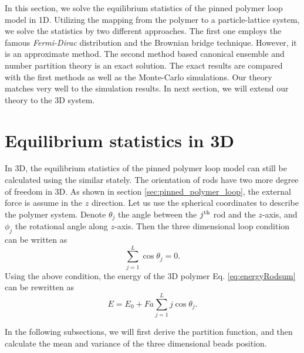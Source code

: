 In this section, we solve the equilibrium statistics of the pinned polymer loop model in 1D. Utilizing the mapping from the polymer to a particle-lattice system, we solve the statistics by two different approaches. The first one employs the famous \emph{Fermi-Dirac} distribution and the Brownian bridge technique. However, it is an approximate method. The second method based canonical ensemble and number partition theory is an exact solution. The exact results are compared with the first methods as well as the Monte-Carlo simulations. Our theory matches very well to the simulation results. In next section, we will extend our theory to the 3D system. 




\section{Equilibrium statistics in 3D}
\label{sec:equilibrium_statistics_in_3d}
In 3D, the equilibrium statistics of the pinned polymer loop model can still be calculated using the similar stately. The orientation of rods have two more degree of freedom in 3D. As shown in section \ref{sec:pinned_polymer_loop}, the external force is assume in the $z$ direction. Let us use the spherical coordinates to describe the polymer system. Denote $\theta_j$ the angle between the $j^{\rm{th}}$ rod and the $z$-axis, and $\phi_j$ the rotational angle along $z$-axis. Then the three dimensional loop condition can be written as
\begin{equation}
    \label{eq:loopCondition3D}
    \sum_{j=1}^L \cos\theta_j = 0.
\end{equation}
Using the above condition, the energy of the 3D polymer Eq. \eqref{eq:energyRodsum} can be rewritten as 
\begin{equation}
    \label{eq:energy3D}
    E = E_0 + Fa\sum_{j=1}^L j\cos\theta_j.
\end{equation}

In the following subsections, we will first derive the partition function, and then calculate the mean and variance of the three dimensional beads position. 


